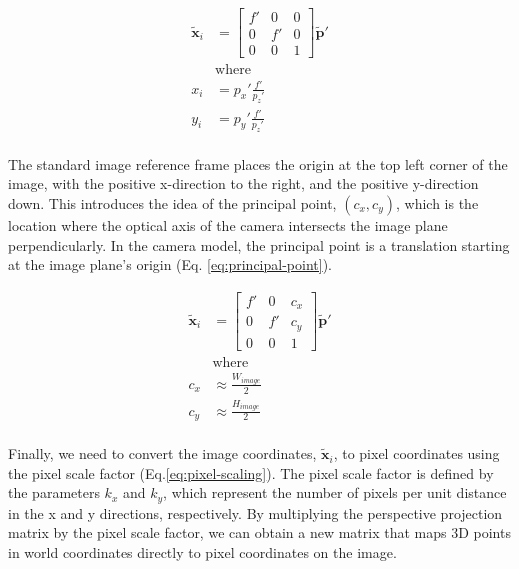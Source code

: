\begin{equation}
    \begin{aligned}
        \tilde{\mathbf{x}}_{i} &= \begin{bmatrix}
            f' & 0 & 0 \\ 0 & f' & 0 \\ 0 & 0 & 1 
        \end{bmatrix} \tilde{\mathbf{p}}' \\
        &\text{where} \\
        x_i &= p_x'\frac{f'}{p_z'} \\
        y_i &= p_y'\frac{f'}{p_z'} \\
    \end{aligned}
    \label{eq:perspective-projection}
\end{equation}

The standard image reference frame places the origin at the top left corner of the image, with the positive x-direction to the right, and the positive y-direction down. This introduces the idea of the principal point, $(c_x,c_y)$, which is the location where the optical axis of the camera intersects the image plane perpendicularly. In the camera model, the principal point is a translation starting at the image plane's origin (Eq. \ref{eq:principal-point}).


\begin{equation}
    \begin{aligned}
        \tilde{\mathbf{x}}_{i} &= \begin{bmatrix}
            f' & 0 & c_x \\ 0 & f' & c_y \\ 0 & 0 & 1 
        \end{bmatrix} \tilde{\mathbf{p}}' \\
        &\text{where} \\
        c_x &\approx \frac{W_{image}}{2} \\
        c_y &\approx \frac{H_{image}}{2} \\
    \end{aligned}
    \label{eq:principal-point}
\end{equation}

Finally, we need to convert the image coordinates, $\tilde{\mathbf{x}}_i$, to pixel coordinates using the pixel scale factor (Eq.\ref{eq:pixel-scaling}). The pixel scale factor is defined by the parameters $k_x$ and $k_y$, which represent the number of pixels per unit distance in the x and y directions, respectively. By multiplying the perspective projection matrix by the pixel scale factor, we can obtain a new matrix that maps 3D points in world coordinates directly to pixel coordinates on the image.

